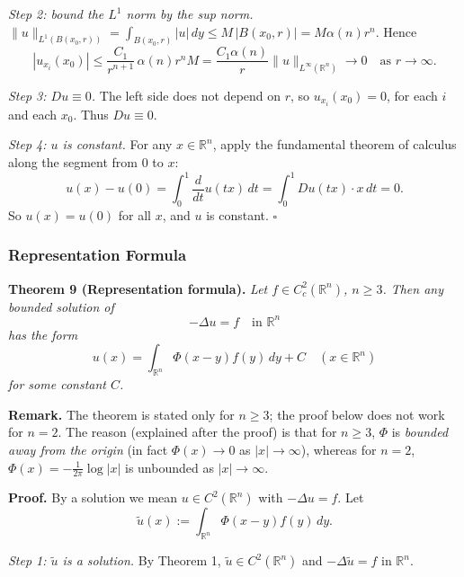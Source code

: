 \documentclass[11pt]{article}
\theoremstyle{plain}
\theoremstyle{definition}
\theoremstyle{remark}
\begin{document}
\emph{Step 2: bound the $L^1$ norm by the sup norm.} $\|u\|_{L^1(B(x_0,r))} = \int_{B(x_0,r)}|u|\, dy \leq M\,|B(x_0,r)| = M\alpha(n)r^n$. Hence
$$ |u_{x_i}(x_0)| \leq \frac{C_1}{r^{n+1}}\, \alpha(n) r^n M = \frac{C_1\alpha(n)}{r}\|u\|_{L^\infty(\mathbb{R}^n)} \to 0 \quad \text{as } r \to \infty. $$

\emph{Step 3: $Du \equiv 0$.} The left side does not depend on $r$, so $u_{x_i}(x_0) = 0$, for each $i$ and each $x_0$. Thus $Du \equiv 0$.

\emph{Step 4: $u$ is constant.} For any $x \in \mathbb{R}^n$, apply the fundamental theorem of calculus along the segment from $0$ to $x$:
$$ u(x) - u(0) = \int_0^1 \frac{d}{dt}u(tx)\, dt = \int_0^1 Du(tx)\cdot x\, dt = 0. $$
So $u(x) = u(0)$ for all $x$, and $u$ is constant. $\square$

\subsubsection{Representation Formula}
\textbf{Theorem 9 (Representation formula).} \textit{Let $f \in C^2_c(\mathbb{R}^n)$, $n \geq 3$. Then any bounded solution of}
$$ -\Delta u = f \quad \text{in } \mathbb{R}^n $$
\textit{has the form}
$$ u(x) = \int_{\mathbb{R}^n}\Phi(x-y)f(y)\, dy + C \quad (x \in \mathbb{R}^n) $$
\textit{for some constant $C$.}

\textbf{Remark.} The theorem is stated only for $n \geq 3$; the proof below does not work for $n = 2$. The reason (explained after the proof) is that for $n \ge 3$, $\Phi$ is \emph{bounded away from the origin} (in fact $\Phi(x) \to 0$ as $|x|\to\infty$), whereas for $n = 2$, $\Phi(x) = -\frac{1}{2\pi}\log|x|$ is unbounded as $|x| \to \infty$.

\textbf{Proof.} By a solution we mean $u \in C^2(\mathbb{R}^n)$ with $-\Delta u = f$. Let
$$ \tilde u(x) := \int_{\mathbb{R}^n}\Phi(x-y)f(y)\, dy. $$

\emph{Step 1: $\tilde u$ is a solution.} By Theorem 1, $\tilde u \in C^2(\mathbb{R}^n)$ and $-\Delta\tilde u = f$ in $\mathbb{R}^n$.
\end{document}

